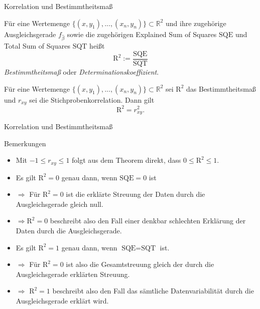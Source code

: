 \documentclass[
  8pt,
  ignorenonframetext,
]{beamer}
\begin{document}
\begin{frame}{Korrelation und Bestimmtheitsmaß}
\protect\hypertarget{korrelation-und-bestimmtheitsmauxdf-8}{}
\footnotesize
\begin{definition}
\justifying
Für eine Wertemenge $\{(x,y_1), ..., (x_n,y_n)\} \subset \mathbb{R}^2$ und ihre
zugehörige Ausgleichsgerade $f_{\hat{\beta}}$ sowie die zugehörigen Explained Sum of Squares $\mbox{SQE}$
und Total Sum of Squares $\mbox{SQT}$ heißt
\begin{equation}
\mbox{R}^2 := \frac{\mbox{SQE}}{\mbox{SQT}}
\end{equation}
\textit{Bestimmtheitsmaß} oder \textit{Determinationskoeffizient}.
\end{definition}

\begin{theorem}
\justifying
\normalfont
Für eine Wertemenge $\{(x,y_1), ..., (x_n,y_n)\} \subset \mathbb{R}^2$ sei
$\mbox{R}^2$ das Bestimmtheitsmaß und $r_{xy}$ sei die Stichprobenkorrelation.
Dann gilt
\begin{equation}
\mbox{R}^2 = r_{xy}^2.
\end{equation}
\end{theorem}
\end{frame}

\begin{frame}{Korrelation und Bestimmtheitsmaß}
\protect\hypertarget{korrelation-und-bestimmtheitsmauxdf-9}{}
\footnotesize


Bemerkungen

\begin{itemize}
\item  Mit $-1 \le r_{xy} \le 1$ folgt aus dem Theorem direkt, dass $0 \le \mbox{R}^2 \le 1$.
\item  Es gilt $\mbox{R}^2 = 0$ genau dann, wenn $\mbox{SQE} = 0$ ist
\item[] $\Rightarrow$ Für $\mbox{R}^2 = 0$ ist die erklärte Streuung der Daten durch die Ausgleichsgerade gleich null.
\item[] $\Rightarrow$$\mbox{R}^2 = 0$ beschreibt also den Fall einer denkbar schlechten Erklärung der Daten durch die Ausgleichsgerade.
\item Es gilt $\mbox{R}^2 = 1$ genau dann, wenn $\mbox{SQE} = \mbox{SQT}$ ist.
\item[] $\Rightarrow$ Für $\mbox{R}^2 = 0$ ist also die Gesamtstreuung gleich der durch die Ausgleichsgerade erklärten Streuung.
\item[] $\Rightarrow$ $\mbox{R}^2 = 1$ beschreibt also den Fall das sämtliche Datenvariabilität durch die Ausgleichsgerade erklärt wird.
\end{itemize}
\end{frame}
\end{document}
